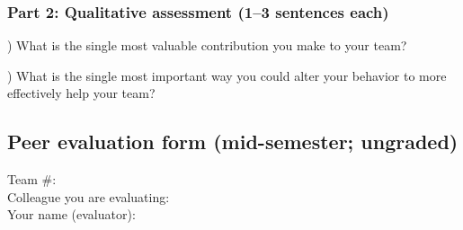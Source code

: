 \documentclass[11pt]{article}
\begin{document}
\subsubsection*{Part 2: Qualitative assessment (1--3 sentences each)}

) What is the single most valuable contribution you make to your team?\\

\vspace{1.2cm}

) What is the single most important way you could alter your behavior to more effectively help your team? 

\newpage
\subsection*{Peer evaluation form (mid-semester; ungraded)}
\pagestyle{empty}

Team \#:  		\\
Colleague you are evaluating: 	\\	
Your name (evaluator):  
\end{document}

